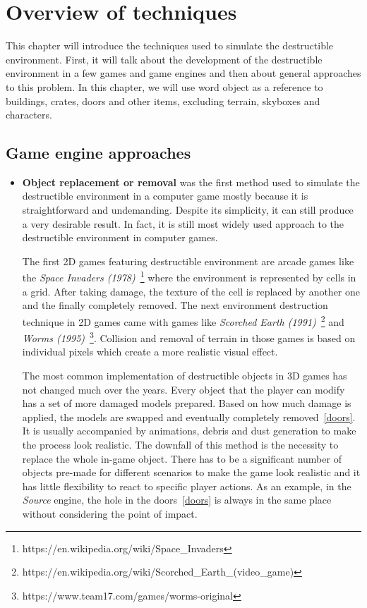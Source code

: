 \chapter{Overview of techniques}
This chapter will introduce the techniques used to simulate the destructible environment. First, it will talk about the development of the destructible environment in a few games and game engines and then about general approaches to this problem. In this chapter, we will use word object as a reference to buildings, crates, doors and other items, excluding terrain, skyboxes and characters.

\section{Game engine approaches}
\begin{itemize}
\item \textbf{Object replacement or removal} was the first method used to simulate the destructible environment in a computer game mostly because it is straightforward and undemanding. Despite its simplicity, it can still produce a very desirable result. In fact, it is still most widely used approach to the destructible environment in computer games.

The first 2D games featuring destructible environment are arcade games like the \emph{Space Invaders (1978)}~\footnote{https://en.wikipedia.org/wiki/Space\_Invaders} where the environment is represented by cells in a grid. After taking damage, the texture of the cell is replaced by another one and the finally completely removed. The next environment destruction technique in 2D games came with games like \emph{Scorched Earth (1991)}~\footnote{https://en.wikipedia.org/wiki/Scorched\_Earth\_(video\_game)} and \emph{Worms (1995)}~\footnote{https://www.team17.com/games/worms-original}. Collision and removal of terrain in those games is based on individual pixels which create a more realistic visual effect.

The most common implementation of destructible objects in 3D games has not changed much over the years. Every object that the player can modify has a set of more damaged models prepared. Based on how much damage is applied, the models are swapped and eventually completely removed~\ref{doors}. It is usually accompanied by animations, debris and dust generation to make the process look realistic. The downfall of this method is the necessity to replace the whole in-game object. There has to be a significant number of objects pre-made for different scenarios to make the game look realistic and it has little flexibility to react to specific player actions. As an example, in the \emph{Source} engine, the hole in the doors~\ref{doors} is always in the same place without considering the point of impact.



\end{itemize}
